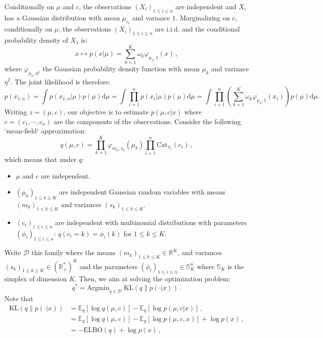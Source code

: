 \documentclass[english,graybox,envcountchap,envcountsame,sectrefs,shortlabels]{svmono}
\theoremstyle{style}
\newcommand{\eqsp}{}
\begin{document}
Conditionally on  $\mu$ and $c$, the observations $(X_i)_{1\leqslant i\leqslant n}$ are independent and $X_i$ has a Gaussian distribution with mean $\mu_{c_i}$ and variance $1$. Marginalizing on $c$, conditionally on  $\mu$, the observations $(X_i)_{1\leqslant i\leqslant n}$ are i.i.d. and the conditional probability density of $X_1$ is:
$$
x\mapsto p(x|\mu) = \sum_{k=1}^K \omega_k \varphi_{\mu_k,1}(x)\,,
$$
where $\varphi_{\mu_k,\eta^2}$ the Gaussian probability density function with mean $\mu_k$ and  variance $\eta^2$. The joint likelihood is therefore:
$$
p(x_{1:n}) = \int p(x_{1:n}|\mu) p(\mu) \mathrm{d} \mu = \int \prod_{i=1}^n p(x_i|\mu) p(\mu) \mathrm{d} \mu = \int \prod_{i=1}^n \left(\sum_{k=1}^K \omega_k \varphi_{\mu_k,1}(x_i)\right) p(\mu) \mathrm{d} \mu\eqsp.
$$
Writing $z = (\mu,c)$, our objective is to estimate $p(\mu,c|x)$ where $c = (c_1,\cdots,c_n)$ are the components of the observations. Consider the following `mean-field` approximation:
$$
q(\mu,c) = \prod_{k=1}^K \varphi_{m_k,s_k}(\mu_k)\prod_{i=1}^n \mathrm{Cat}_{\phi_i}(c_i)\,, 
$$
which means that under $q$:
\begin{itemize}
\item $\mu$ and  $c$ are independent.
\item $(\mu_{k})_{1\leqslant k \leqslant K}$ are independent Gaussian random variables with means $(m_{k})_{1\leqslant k \leqslant K}$ and variances $(s_{k})_{1\leqslant k \leqslant K}$.
\item $(c_{i})_{1\leqslant i \leqslant n}$ are independent with  multinomial distributions with parameters  $(\phi_i)_{1\leqslant i \leqslant n}$: $q(c_i=k) = \phi_i(k)$ for $1\leqslant k \leqslant K$. 
\end{itemize}
Write $\mathcal{D}$ this family where the means $(m_{k})_{1\leqslant k \leqslant K}\in \mathbb{R}^K$, and variances $(s_{k})_{1\leqslant k \leqslant K}\in (\mathbb{R}_+^*)^K$ and the parameters  $(\phi_i)_{1\leqslant i \leqslant n}\in \mathbb{S}_K^n$ where $\mathbb{S}_K$ is the simplex of dimension $K$.  Then, we aim at solving the optimization problem:
$$
q^* = \mathrm{Argmin}_{q\in\mathcal{D}}\; \mathrm{KL}\left(q\|p(\cdot|x)\right)\,.
$$
Note that
\begin{align*}
\mathrm{KL}\left(q\|p(\cdot|x)\right) &= \mathbb{E}_q[\log q(\mu,c)] - \mathbb{E}_q[\log p(\mu,c|x)]\,,\\
 &= \mathbb{E}_q[\log q(\mu,c)] - \mathbb{E}_q[\log p(\mu,c,x)]+\log p(x)\,,\\
&= -\mathrm{ELBO}(q)+\log p(x)\,,
\end{align*}
\end{document}
